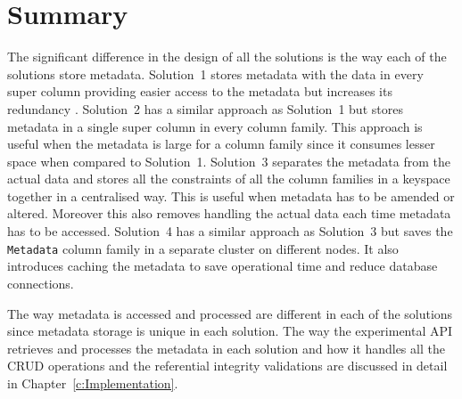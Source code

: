 \section{Summary}\label{s:Design-summary}
The significant difference in the design of all the  solutions is the way each
of the solutions store metadata.  Solution~1 stores metadata with the data in
every super column providing easier access to the metadata but increases its
redundancy . 
Solution~2 has a similar approach as Solution~1 but stores metadata in a single
super column in every column family. This approach is useful when the metadata
is large for a column family since it consumes lesser space when compared to Solution~1.
Solution~3 separates the metadata from
the actual data and stores all the constraints of all the column families in a
keyspace together in a centralised way.  This is useful when metadata has to be
amended or altered. 
Moreover this also removes handling the actual data each time metadata has to be
accessed.  
Solution~4 has a similar approach as Solution~3 but saves the \texttt{Metadata}
column family in a separate cluster on different nodes.  It also introduces
caching the metadata  to save operational time and reduce database connections. 

The way metadata is accessed and processed are different in each of the
solutions since metadata storage is unique in each  solution.  The way the
experimental \ac{API} retrieves and processes the metadata in each solution and
how it handles all the \ac{CRUD} operations and the referential integrity validations 
are discussed in detail in Chapter~\ref{c:Implementation}. 



